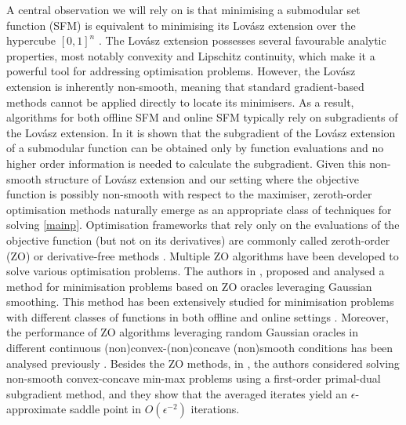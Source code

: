 \documentclass{article}
\theoremstyle{plain}
\theoremstyle{definition}
\theoremstyle{remark}
\begin{document}
A central observation we will rely on is that minimising a submodular set function (SFM) is equivalent to minimising its Lovász extension over the hypercube $[0,1]^n$ \cite{lovasz1983submodular}. 
The Lovász extension possesses several favourable analytic properties, most notably convexity and Lipschitz continuity, which make it a powerful tool for addressing optimisation problems. 
However, the Lovász extension is inherently non-smooth, meaning that standard gradient-based methods cannot be applied directly to locate its minimisers. 
As a result, algorithms for both offline SFM \cite{hamoudi2019quantum,axelrod2020near} and online SFM \cite{hazan2012online,jegelka2011online,cardoso2019differentially} typically rely on subgradients of the Lovász extension. %
In \cite{hazan2012online} it is shown that the subgradient of the Lovász extension of a submodular function can be obtained only by function evaluations and no higher order information is needed to calculate the subgradient. 
Given this non-smooth structure of Lovász extension and our setting where the objective function is possibly non-smooth with respect to the maximiser, zeroth-order optimisation methods naturally emerge as an appropriate class of techniques for solving \eqref{mainp}.
%
Optimisation frameworks that rely only on the evaluations of the objective function (but not on its derivatives) are commonly called zeroth-order (ZO) or derivative-free methods \cite{audet2017introduction}. Multiple ZO algorithms have been developed to solve various optimisation problems. The authors in \cite{nesterov_random_2017}, proposed and analysed a method for minimisation problems based on ZO oracles leveraging Gaussian smoothing. This method has been extensively studied for minimisation problems with different classes of functions in both offline \cite{farzin2024minimisation,farzin2025minimisation} and online settings \cite{shames2019online,farzin2025minimisationsubmodular}. Moreover, the performance of ZO algorithms leveraging random Gaussian oracles in different continuous (non)convex-(non)concave (non)smooth conditions has been analysed previously \cite{wang2023zeroth,farzin2025minmax}. Besides the ZO methods, in \citep{nedic2009subgradient}, the authors considered solving non-smooth 
convex-concave min-max problems using a first-order primal-dual subgradient method, and they 
show that the averaged iterates yield an $\epsilon$-approximate saddle point in 
$O(\epsilon^{-2})$ iterations.
\end{document}
